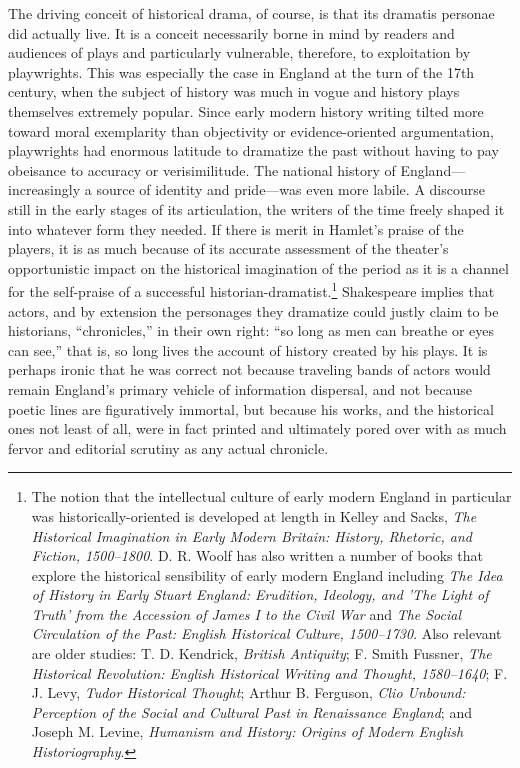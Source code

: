 The driving conceit of historical drama, of course, is that its dramatis personae did actually live. It is a conceit necessarily borne in mind by readers and audiences of plays and particularly vulnerable, therefore, to exploitation by playwrights. This was especially the case in England at the turn of the 17th century, when the subject of history was much in vogue and history plays themselves extremely popular. Since early modern history writing tilted more toward moral exemplarity than objectivity or evidence-oriented argumentation, playwrights had enormous latitude to dramatize the past without having to pay obeisance to accuracy or verisimilitude. The national history of England---increasingly a source of identity and pride---was even more labile. A discourse still in the early stages of its articulation, the writers of the time freely shaped it into whatever form they needed. If there is merit in Hamlet's praise of the players, it is as much because of its accurate assessment of the theater's opportunistic impact on the historical imagination of the period as it is a channel for the self-praise of a successful historian-dramatist.\footnote{The notion that the intellectual culture of early modern England in particular was historically-oriented is developed at length in Kelley and Sacks, \emph{The Historical Imagination in Early Modern Britain: History, Rhetoric, and Fiction, 1500--1800}.\nocite{kelley_historical_1997} D. R. Woolf has also written a number of books that explore the historical sensibility of early modern England including \emph{The Idea of History in Early Stuart England: Erudition, Ideology, and 'The Light of Truth' from the Accession of James I to the Civil War}\nocite{woolf_idea_1990} and \emph{The Social Circulation of the Past: English Historical Culture, 1500--1730}.\nocite{woolf_social_2003} Also relevant are older studies: T. D. Kendrick, \emph{British Antiquity}\nocite{kendrick_british_1950}; F. Smith Fussner, \emph{The Historical Revolution: English Historical Writing and Thought, 1580--1640}\nocite{fussner_historical_1962}; F. J. Levy, \emph{Tudor Historical Thought}\nocite{levy_tudor_1967}; Arthur B. Ferguson, \emph{Clio Unbound: Perception of the Social and Cultural Past in Renaissance England}\nocite{ferguson_clio_1979}; and Joseph M. Levine, \emph{Humanism and History: Origins of Modern English Historiography}\nocite{levine_humanism_1987}.}
Shakespeare implies that actors, and by extension the personages they dramatize could justly claim to be historians, ``chronicles,'' in their own right: ``so long as men can breathe or eyes can see,'' that is, so long lives the account of history created by his plays. It is perhaps ironic that he was correct not because traveling bands of actors would remain England's primary vehicle of information dispersal, and not because poetic lines are figuratively immortal, but because his works, and the historical ones not least of all, were in fact printed and ultimately pored over with as much fervor and editorial scrutiny as any actual chronicle.

